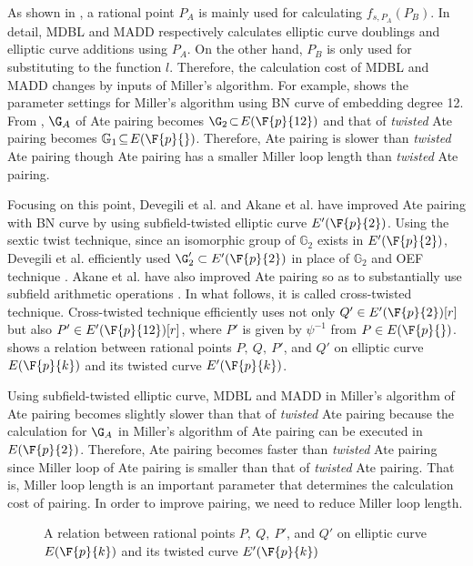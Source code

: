 As shown in , a rational point $P_A$ is mainly used for calculating $f_{s,P_A}(P_B)$.
In detail, MDBL and MADD respectively calculates elliptic curve doublings and elliptic curve additions using $P_A$.
On the other hand, $P_B$ is only used for substituting to the function $l$.
Therefore, the calculation cost of MDBL and MADD changes by inputs of Miller's algorithm.
For example,  shows the parameter settings for Miller's algorithm using BN curve of embedding degree 12.
From , $\G_A$ of Ate pairing becomes $\G_2\!\subset\! E(\F{p}{12})$ and that of {\it twisted} Ate pairing becomes $\mathbb{G}_1 \!\subseteq \!E(\F{p}{})$.
Therefore, Ate pairing is slower than {\it twisted} Ate pairing though Ate pairing has a smaller Miller loop length than {\it twisted} Ate pairing.

Focusing on this point, Devegili et al. \cite{PAIRING:DevScoDah07} and Akane et al.\cite{CSS2} have improved Ate pairing with BN curve by using subfield-twisted elliptic curve $E'(\F{p}{2})$.
Using the sextic twist technique, since an isomorphic group of $\mathbb{G}_2$ exists in $E'(\F{p}{2})$, Devegili et al. efficiently used $\G_2'\subset E'(\F{p}{2})$ in place of $\mathbb{G}_2$ and OEF technique \cite{JC:BaiPaa01} .  Akane et al. have also improved Ate pairing so as to substantially use subfield arithmetic operations \cite{CSS2}. 
In what follows, it is called cross-twisted technique. Cross-twisted technique \cite{CSS2} efficiently uses not only $Q'\in E'(\F{p}{2})[r]$ but also $P'\in E'(\F{p}{12})[r]$, where $P'$ is given by $\psi^{-1}$ from $P\in E(\F{p}{})$.  shows a relation between rational points $P,\ Q,\ P'$, and $Q'$ on elliptic curve $E(\F{p}{k})$ and its twisted curve $E'(\F{p}{k})$. 

Using subfield-twisted elliptic curve, MDBL and MADD in Miller's algorithm of Ate pairing becomes slightly slower than that of {\it twisted} Ate pairing because the calculation for $\G_A$ in Miller's algorithm of Ate pairing can be executed in $E(\F{p}{2})$.
Therefore, Ate pairing becomes faster than {\it twisted} Ate pairing since Miller loop of Ate pairing is smaller than that of {\it twisted} Ate pairing.
That is, Miller loop length is an important parameter that determines the calculation cost of pairing.
In order to improve pairing, we need to reduce Miller loop length.

\begin{figure}[ht]
\begin{center}\label{fig:twist_point_relation}

\end{center}
\caption{A relation between rational points $P,\ Q,\ P'$, and $Q'$ on elliptic curve $E(\F{p}{k})$ and its twisted curve $E'(\F{p}{k})$}
\end{figure}
 

